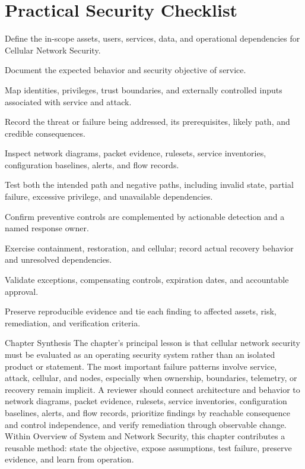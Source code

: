\documentclass[11pt,letterpaper]{article}
\begin{document}
\section*{Practical Security Checklist}
\begin{CornellChecklist}
\item Define the in-scope assets, users, services, data, and operational dependencies for Cellular Network Security.
\item Document the expected behavior and security objective of service.
\item Map identities, privileges, trust boundaries, and externally controlled inputs associated with service and attack.
\item Record the threat or failure being addressed, its prerequisites, likely path, and credible consequences.
\item Inspect network diagrams, packet evidence, rulesets, service inventories, configuration baselines, alerts, and flow records.
\item Test both the intended path and negative paths, including invalid state, partial failure, excessive privilege, and unavailable dependencies.
\item Confirm preventive controls are complemented by actionable detection and a named response owner.
\item Exercise containment, restoration, and cellular; record actual recovery behavior and unresolved dependencies.
\item Validate exceptions, compensating controls, expiration dates, and accountable approval.
\item Preserve reproducible evidence and tie each finding to affected assets, risk, remediation, and verification criteria.
\end{CornellChecklist}
\begin{CornellSummaryBox}{Chapter Synthesis}
The chapter's principal lesson is that cellular network security must be evaluated as an operating security system rather than an isolated product or statement. The most important failure patterns involve service, attack, cellular, and nodes, especially when ownership, boundaries, telemetry, or recovery remain implicit. A reviewer should connect architecture and behavior to network diagrams, packet evidence, rulesets, service inventories, configuration baselines, alerts, and flow records, prioritize findings by reachable consequence and control independence, and verify remediation through observable change. Within Overview of System and Network Security, this chapter contributes a reusable method: state the objective, expose assumptions, test failure, preserve evidence, and learn from operation.
\end{CornellSummaryBox}
\end{document}
